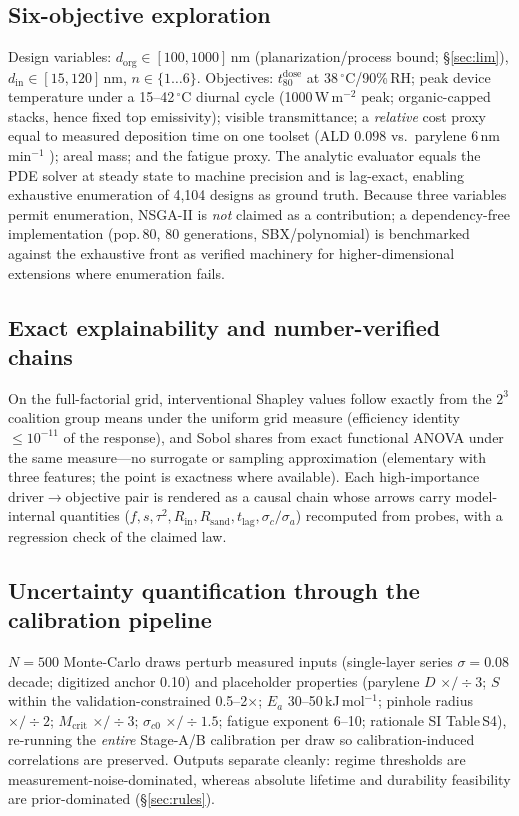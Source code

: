 \documentclass[11pt]{article}
\newcommand{\dorg}{d_{\mathrm{org}}}
\newcommand{\din}{d_{\mathrm{in}}}
\newcommand{\tdose}{t_{80}^{\mathrm{dose}}}
\begin{document}
\subsection{Six-objective exploration}
Design variables: $\dorg\in[100,1000]$\,nm (planarization/process bound; \S\ref{sec:lim}), $\din\in[15,120]$\,nm, $n\in\{1\ldots6\}$. Objectives: $\tdose$ at 38\,$^{\circ}$C/90\%\,RH; peak device temperature under a 15--42\,$^{\circ}$C diurnal cycle (1000\,W\,m$^{-2}$ peak; organic-capped stacks, hence fixed top emissivity); visible transmittance; a \emph{relative} cost proxy equal to measured deposition time on one toolset (ALD 0.098 vs.\ parylene 6\,nm\,min$^{-1}$ \cite{wu2018}); areal mass; and the fatigue proxy. The analytic evaluator equals the PDE solver at steady state to machine precision and is lag-exact, enabling exhaustive enumeration of 4{,}104 designs as ground truth. Because three variables permit enumeration, NSGA-II is \emph{not} claimed as a contribution; a dependency-free implementation (pop.\,80, 80 generations, SBX/polynomial) is benchmarked against the exhaustive front as verified machinery for higher-dimensional extensions where enumeration fails.

\subsection{Exact explainability and number-verified chains}
On the full-factorial grid, interventional Shapley values follow exactly from the $2^3$ coalition group means under the uniform grid measure (efficiency identity $\le10^{-11}$ of the response), and Sobol shares from exact functional ANOVA under the same measure---no surrogate or sampling approximation (elementary with three features; the point is exactness where available). Each high-importance driver$\to$objective pair is rendered as a causal chain whose arrows carry model-internal quantities ($f,s,\tau^2,R_{\mathrm{in}},R_{\mathrm{sand}},t_{\mathrm{lag}},\sigma_c/\sigma_a$) recomputed from probes, with a regression check of the claimed law.

\subsection{Uncertainty quantification through the calibration pipeline}
$N{=}500$ Monte-Carlo draws perturb measured inputs (single-layer series $\sigma{=}0.08$ decade; digitized anchor 0.10) and placeholder properties (parylene $D$ $\times/\div3$; $S$ within the validation-constrained 0.5--2$\times$; $E_a$ 30--50\,kJ\,mol$^{-1}$; pinhole radius $\times/\div2$; $M_{\mathrm{crit}}$ $\times/\div3$; $\sigma_{c0}$ $\times/\div1.5$; fatigue exponent 6--10; rationale SI Table\,S4), re-running the \emph{entire} Stage-A/B calibration per draw so calibration-induced correlations are preserved. Outputs separate cleanly: regime thresholds are measurement-noise-dominated, whereas absolute lifetime and durability feasibility are prior-dominated (\S\ref{sec:rules}).
\end{document}
